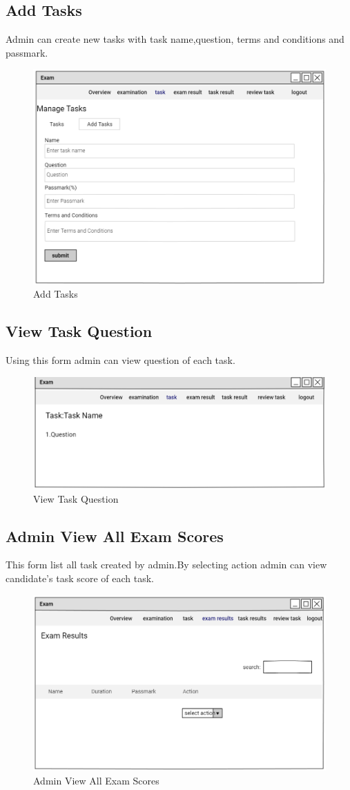 \documentclass[a4paper,12pt]{report}
\begin{document}
\subsection {Add Tasks}
 Admin can create new tasks with task name,question, terms and conditions and passmark.
\begin{figure}[bph]
	\centering
	\includegraphics[width=.6\linewidth]{img/admin/addtask}
	\caption{Add Tasks}
\end{figure}
\pagebreak
\subsection {View Task Question}
Using this form admin can view question of each task.
\begin{figure}[bph]
	\centering
	\includegraphics[width=.6\linewidth]{img/admin/viewtaskqstn}
	\caption{View Task Question}
\end{figure}
\pagebreak
\subsection { Admin View All Exam Scores}
This form list all task created by admin.By selecting action admin can view candidate's  task score of each task. 
\begin{figure}[bph]
	\centering
	\includegraphics[width=.6\linewidth]{img/admin/adviewallxmrslt}
	\caption{ Admin View All Exam Scores}
\end{figure}
\pagebreak
\end{document}
